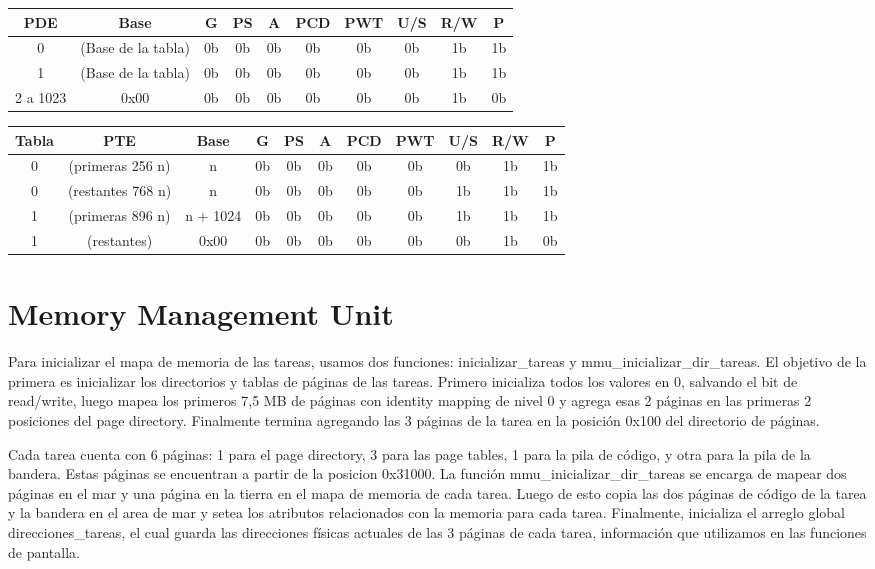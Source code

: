 \documentclass[10pt, a4paper]{article}
\begin{document}
\begin{center}
\begin{tabular}{| c || c | c | c | c | c | c | c | c | c |}

	\hline
		PDE & Base & G & PS & A & PCD & PWT & U/S & R/W & P\\
	\hline
		0 & (Base de la tabla) & 0b & 0b & 0b & 0b & 0b & 0b & 1b & 1b \\
		1 & (Base de la tabla) & 0b & 0b & 0b & 0b & 0b & 0b & 1b & 1b \\
		2 a  1023 & 0x00 & 0b & 0b & 0b & 0b & 0b & 0b & 1b & 0b\\
	\hline

\end{tabular}


\begin{tabular}{| c | c || c | c | c | c | c | c | c | c | c |}

	\hline
		Tabla & PTE & Base & G & PS & A & PCD & PWT & U/S & R/W & P\\
	\hline
		0 & (primeras 256 n) & n & 0b & 0b & 0b & 0b & 0b & 0b & 1b & 1b \\
		0 & (restantes 768 n) & n & 0b & 0b & 0b & 0b & 0b & 1b & 1b & 1b \\
		1 & (primeras 896 n) & n + 1024 & 0b & 0b & 0b & 0b & 0b & 1b & 1b & 1b \\
		1 & (restantes)& 0x00 & 0b & 0b & 0b & 0b & 0b & 0b & 1b & 0b\\
	\hline

\end{tabular}
\end{center}
\section{Memory Management Unit}

Para inicializar el mapa de memoria de las tareas, usamos dos funciones: inicializar\_tareas y mmu\_inicializar\_dir\_tareas. El objetivo de la primera es
inicializar los directorios y tablas de p\'aginas de las tareas. Primero inicializa todos los valores en 0, salvando el bit de read/write, luego 
mapea los primeros 7,5 MB de p\'aginas con identity mapping de nivel 0 y agrega esas 2 p\'aginas en las primeras 2 posiciones del page directory. 
Finalmente termina agregando las 3 p\'aginas de la tarea en la posici\'on 0x100 del directorio de p\'aginas.

Cada tarea cuenta con 6 p\'aginas: 1 para el page directory, 3 para las page tables, 1 para la pila de c\'odigo, y otra para la pila de la bandera. Estas p\'aginas 
se encuentran a partir de la posicion 0x31000.
La funci\'on mmu\_inicializar\_dir\_tareas se encarga de mapear dos p\'aginas en el mar y una p\'agina en la tierra en el mapa de memoria de cada tarea.
Luego de esto copia las dos p\'aginas de c\'odigo de la tarea y la bandera en el area de mar y setea los atributos relacionados con la memoria para cada
tarea. Finalmente, inicializa el arreglo global direcciones\_tareas, el cual guarda las direcciones f\'isicas actuales de las 3 p\'aginas
de cada tarea, informaci\'on que utilizamos en las funciones de pantalla.
\end{document}
